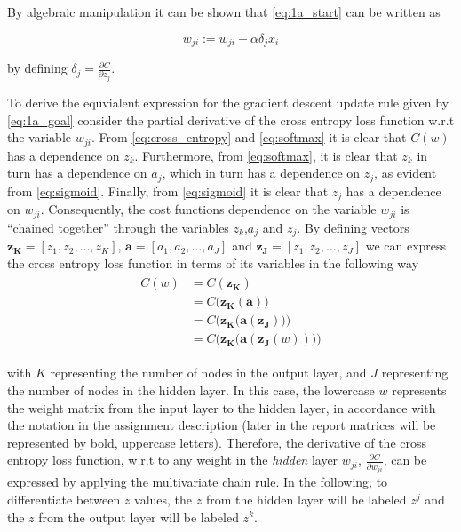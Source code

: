 \documentclass{article}
\begin{document}
By algebraic manipulation it can be shown that \eqref{eq:1a_start} can be written as

\begin{equation}
    w_{j i}:=w_{j i}-\alpha \delta_{j} x_{i}
    \label{eq:1a_goal}
\end{equation}

by defining $\delta_{j}=\frac{\partial C}{\partial z_{j}}$.

To derive the equvialent expression for the gradient descent update rule given by \eqref{eq:1a_goal} consider the partial derivative of the cross entropy loss function w.r.t the variable $w_{ji}$. From \eqref{eq:cross_entropy} and \eqref{eq:softmax} it is clear that $C(w)$ has a dependence on $z_k$. Furthermore, from \eqref{eq:softmax}, it is clear that $z_k$ in turn has a dependence on $a_j$, which in turn has a dependence on $z_j$, as evident from \eqref{eq:sigmoid}. Finally, from \eqref{eq:sigmoid} it is clear that $z_j$ has a dependence on $w_{ji}$. Consequently, the cost functions dependence on the variable $w_{ji}$ is ``chained together'' through the variables $z_k$,$a_j$ and $z_j$. By defining vectors $\boldsymbol{z_{K}} = [z_1,z_2,\dots,z_K]$, $\boldsymbol{a} = [a_1,a_2,\dots,a_J]$ and $\boldsymbol{z_J} = [z_1,z_2,\dots,z_J]$ we can express the cross entropy loss function in terms of its variables in the following way
\begin{align}
\begin{split}
    C(w) &= C(\boldsymbol{z_K}) \\ 
    &= C\big(\boldsymbol{z_K}(\boldsymbol{a})\big) \\
    &= C\bigg(\boldsymbol{z_K}\big(\boldsymbol{a}(\boldsymbol{z_J})\big)\bigg) \\
    &= C\bigg(\boldsymbol{z_K}\big(\boldsymbol{a}(\boldsymbol{z_J}(w))\big)\bigg)
    \label{eq:cost_var_def}
\end{split}
\end{align}

with $K$ representing the number of nodes in the output layer, and $J$ representing the number of nodes in the hidden layer. In this case, the lowercase $w$ represents the weight matrix from the input layer to the hidden layer, in accordance with the notation in the assignment description (later in the report matrices will be represented by bold, uppercase letters). Therefore, the derivative of the cross entropy loss function, w.r.t to any weight in the \textit{hidden} layer $w_{ji}$, $\frac{\partial C}{\partial w_{ji}}$, can be expressed by applying the multivariate chain rule. In the following, to differentiate between $z$ values, the $z$ from the hidden layer will be labeled $z^j$ and the $z$ from the output layer will be labeled $z^k$. 
\end{document}
